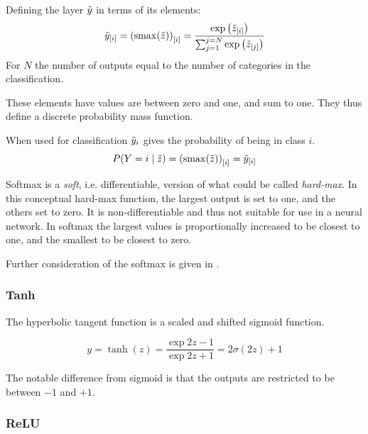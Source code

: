 \documentclass[12pt,parskip]{komatufte}
\begin{document}
Defining the layer $\tilde{y}$ in terms of its elements:
\begin{equation}
\iv y_i=\i {\left(\softmax(\v z)\right)}_i= \frac{\exp{\iv z_i}}{\sum_{j=1}^{j=N} \exp{\iv z_j}}
\end{equation}
For $N$ the number of outputs equal to the number of categories in the classification.

These elements have  values are between zero and one, and sum to one.
They thus define a discrete probability mass function.

When used for classification $\tilde{y}_i$ gives the probability of being in class $i$.
\begin{equation}
P(Y=i\mid \v z) = \i {\left(\softmax(\v z)\right)}_i  = \iv y_i
\end{equation}



Softmax is a \emph{soft}, i.e. differentiable,  version of what could be called \emph{hard-max}.
In this conceptual hard-max function, the largest output is set to one, and the others set to zero.
It is non-differentiable and thus not suitable for use in a neural network.
In softmax the largest values is proportionally increased to be closest to one,
and the smallest to be closest to zero.

Further consideration of the softmax is given in .

\subsubsection{Tanh}

The hyperbolic tangent function is a  scaled and shifted sigmoid function.

\begin{equation}
y=\tanh(z)=\frac{\exp{2z}-1}{\exp{2z}+1}=2\sigma(2z)+1
\end{equation}

The notable difference from sigmoid is that the outputs are restricted to be between $-1$ and $+1$.

\subsubsection{ReLU}
\end{document}

